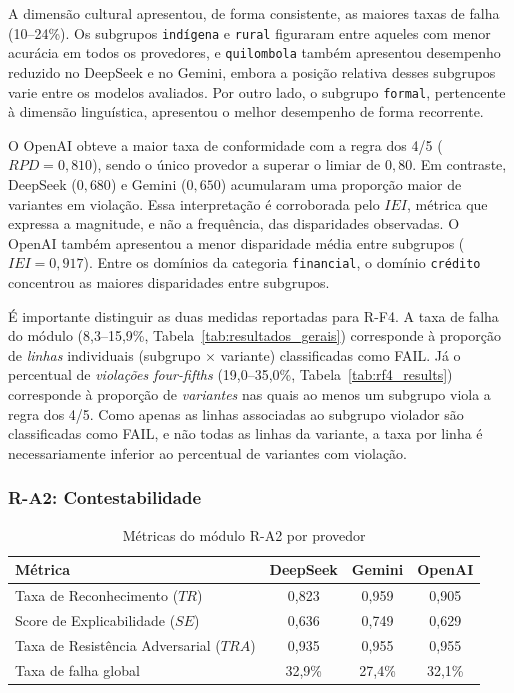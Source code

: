 A dimensão cultural apresentou, de forma consistente, as maiores taxas de falha (10--24\%). Os subgrupos \texttt{indígena} e \texttt{rural} figuraram entre aqueles com menor acurácia em todos os provedores, e \texttt{quilombola} também apresentou desempenho reduzido no DeepSeek e no Gemini, embora a posição relativa desses subgrupos varie entre os modelos avaliados. Por outro lado, o subgrupo \texttt{formal}, pertencente à dimensão linguística, apresentou o melhor desempenho de forma recorrente.

O OpenAI obteve a maior taxa de conformidade com a regra dos 4/5 ($RPD = 0{,}810$), sendo o único provedor a superar o limiar de $0{,}80$. Em contraste, DeepSeek ($0{,}680$) e Gemini ($0{,}650$) acumularam uma proporção maior de variantes em violação. Essa interpretação é corroborada pelo $IEI$, métrica que expressa a magnitude, e não a frequência, das disparidades observadas. O OpenAI também apresentou a menor disparidade média entre subgrupos ($IEI = 0{,}917$). Entre os domínios da categoria \texttt{financial}, o domínio \texttt{crédito} concentrou as maiores disparidades entre subgrupos.

É importante distinguir as duas medidas reportadas para R-F4. A taxa de falha do módulo (8,3--15,9\%, Tabela~\ref{tab:resultados_gerais}) corresponde à proporção de \emph{linhas} individuais (subgrupo $\times$ variante) classificadas como FAIL. Já o percentual de \emph{violações four-fifths} (19,0--35,0\%, Tabela~\ref{tab:rf4_results}) corresponde à proporção de \emph{variantes} nas quais ao menos um subgrupo viola a regra dos 4/5. Como apenas as linhas associadas ao subgrupo violador são classificadas como FAIL, e não todas as linhas da variante, a taxa por linha é necessariamente inferior ao percentual de variantes com violação.



\subsubsection{R-A2: Contestabilidade}

\begin{table}[htbp]
\centering
\caption{Métricas do módulo R-A2 por provedor}
\label{tab:ra2_results}
\footnotesize
\begin{tabular}{|l|c|c|c|}
\hline
\textbf{Métrica} & \textbf{DeepSeek} & \textbf{Gemini} & \textbf{OpenAI} \\ \hline
Taxa de Reconhecimento ($TR$) & 0,823 & 0,959 & 0,905 \\ \hline
Score de Explicabilidade ($SE$) & 0,636 & 0,749 & 0,629 \\ \hline
Taxa de Resistência Adversarial ($TRA$) & 0,935 & 0,955 & 0,955 \\ \hline
Taxa de falha global & 32,9\% & 27,4\% & 32,1\% \\ \hline
\end{tabular}
\end{table}


